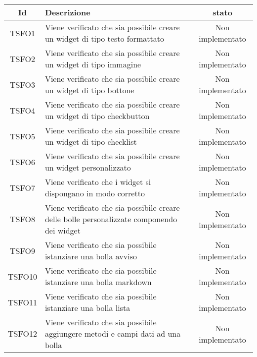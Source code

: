 \begin{center}
	\begin{longtable}{|c|>{\centering}m{10cm}|c|}\hline
		Id & Descrizione & stato \\ \hline
		TSFO1 & Viene verificato che sia possibile creare un widget di tipo testo formattato & Non implementato \\ \hline
		TSFO2 & Viene verificato che sia possibile creare un widget di tipo immagine & Non implementato \\ \hline
		TSFO3 & Viene verificato che sia possibile creare un widget di tipo bottone & Non implementato \\ \hline
		TSFO4 & Viene verificato che sia possibile creare un widget di tipo checkbutton & Non implementato \\ \hline
		TSFO5 & Viene verificato che sia possibile creare un widget di tipo checklist & Non implementato \\ \hline
		TSFO6 & Viene verificato che sia possibile creare un widget personalizzato & Non implementato \\ \hline
		TSFO7 & Viene verificato che i widget si dispongano in modo corretto & Non implementato \\ \hline
		TSFO8 & Viene verificato che sia possibile creare delle bolle personalizzate componendo dei widget & Non implementato \\ \hline
		TSFO9 & Viene verificato che sia possibile istanziare una bolla avviso & Non implementato \\ \hline
		TSFO10 & Viene verificato che sia possibile istanziare una bolla markdown & Non implementato \\ \hline
		TSFO11 & Viene verificato che sia possibile istanziare una bolla lista & Non implementato \\ \hline
		TSFO12 & Viene verificato che sia possibile aggiungere metodi e campi dati ad una bolla & Non implementato \\ \hline
	\end{longtable}
\end{center}
